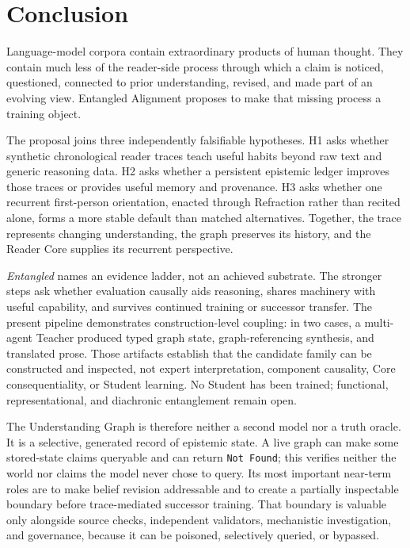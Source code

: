 	\section{Conclusion}\label{sec:conclusion}

Language-model corpora contain extraordinary products of human thought. They
contain much less of the reader-side process through which a claim is noticed,
questioned, connected to prior understanding, revised, and made part of an
evolving view. Entangled Alignment proposes to make that missing process a
training object.

The proposal joins three independently falsifiable hypotheses. H1 asks whether
synthetic chronological reader traces teach useful habits beyond raw text and
generic reasoning data. H2 asks whether a persistent epistemic ledger improves
those traces or provides useful memory and provenance. H3 asks whether one
recurrent first-person orientation, enacted through Refraction rather than
recited alone, forms a more stable default than matched alternatives. Together,
the trace represents changing understanding, the graph preserves its history,
and the Reader Core supplies its recurrent perspective.

\emph{Entangled} names an evidence ladder, not an achieved substrate. The stronger
steps ask whether evaluation causally aids reasoning, shares machinery with
useful capability, and survives continued training or successor transfer. The
present pipeline demonstrates construction-level coupling: in two cases, a
multi-agent Teacher produced typed graph state, graph-referencing synthesis, and
translated prose. Those artifacts establish that the candidate family can be
constructed and inspected, not expert interpretation, component causality, Core
consequentiality, or Student learning. No Student has been trained; functional,
representational, and diachronic entanglement remain open.

The Understanding Graph is therefore neither a second model nor a truth oracle.
It is a selective, generated record of epistemic state. A live graph can make
some stored-state claims queryable and can return \texttt{Not Found}; this
verifies neither the world nor claims the model never chose to query. Its most
important near-term roles are to make belief revision addressable and to create
a partially inspectable boundary before trace-mediated successor training.
That boundary is valuable only alongside source checks, independent validators,
mechanistic investigation, and governance, because it can be poisoned,
selectively queried, or bypassed.


